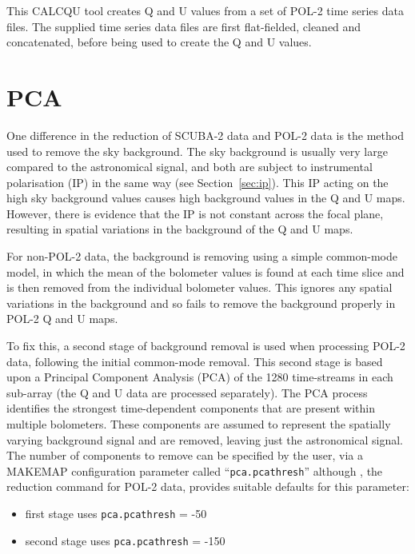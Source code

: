 This CALCQU tool creates Q and U values from a set of POL-2 time
series data files. The supplied time series data files are first
flat-fielded, cleaned and concatenated, before being used to create
the Q and U values.


\section{PCA}
\label{sec:pca}

One difference in the reduction of SCUBA-2 data and POL-2 data is the
method used to remove the sky background.  The sky background is usually
very large compared to the astronomical signal, and both are subject to
instrumental polarisation (IP) in the same way (see Section~\ref{sec:ip}). This
IP acting on the high sky background values causes high background values
in the Q and U maps. However, there is evidence that the IP is not
constant across the focal plane, resulting in spatial variations in the
background of the Q and U maps.

For non-POL-2 data, the background is removing using a simple common-mode
model, in which the mean of the bolometer values is found at each time
slice and is then removed from the individual bolometer values. This
ignores any spatial variations in the background and so fails to remove
the background properly in POL-2 Q and U maps.

To fix this, a second stage of background removal is used when processing
POL-2 data, following the initial common-mode removal. This second stage
is based upon a Principal Component Analysis (PCA) of the 1280
time-streams in each sub-array (the Q and U data are processed
separately). The PCA process identifies the strongest time-dependent
components that are present within multiple bolometers. These components
are assumed to represent the spatially varying background signal and are
removed, leaving just the astronomical signal. The number of components
to remove can be specified by the user, via a MAKEMAP configuration
parameter called ``\texttt{pca.pcathresh}'' although
, the reduction command for POL-2
data, provides suitable defaults for this parameter:

\begin{itemize}
\item first stage uses \texttt{pca.pcathresh} = -50
\item second stage uses \texttt{pca.pcathresh} = -150
\end{itemize}

